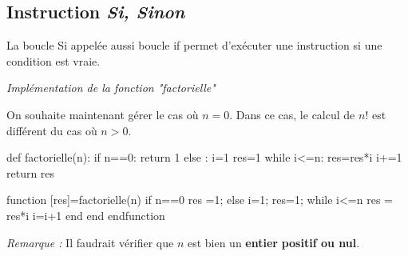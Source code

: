 \documentclass[10pt,fleqn]{article} %
\begin{document}
\subsection{Instruction \textsl{Si, Sinon}}

\begin{defi}
La boucle \textsf{Si} appelée aussi boucle \textsf{if} permet d'exécuter une instruction si une condition est vraie.
\end{defi}


\begin{exemple}
\textit{Implémentation de la fonction "factorielle"}

On souhaite maintenant gérer le cas où $n=0$. Dans ce cas, le calcul de $n!$ est différent du cas où $n>0$.

\begin{minipage}[c]{.35\linewidth}
\begin{pseudo}
\begin{algorithm}[H]
\end{algorithm}
\end{pseudo}
\end{minipage}\hfill
\begin{minipage}[c]{.3\linewidth}
\begin{py}
\begin{python}
def factorielle(n):
    if n==0:
        return 1
    else :
        i=1    
        res=1
        while i<=n:
            res=res*i
            i+=1
        return res
\end{python}
\end{py}
\end{minipage}\hfill
\begin{minipage}[c]{.3\linewidth}
\begin{sci}
\begin{scilab}
function [res]=factorielle(n)
  if n==0
    res =1;
  else
    i=1;
    res=1;
    while i<=n
      res = res*i
      i=i+1
    end
  end  
endfunction
\end{scilab}
\end{sci}
\end{minipage}

\textit{Remarque :} Il faudrait vérifier que $n$ est bien un \textbf{entier} \textbf{positif ou nul}.
\end{exemple}
\end{document}
